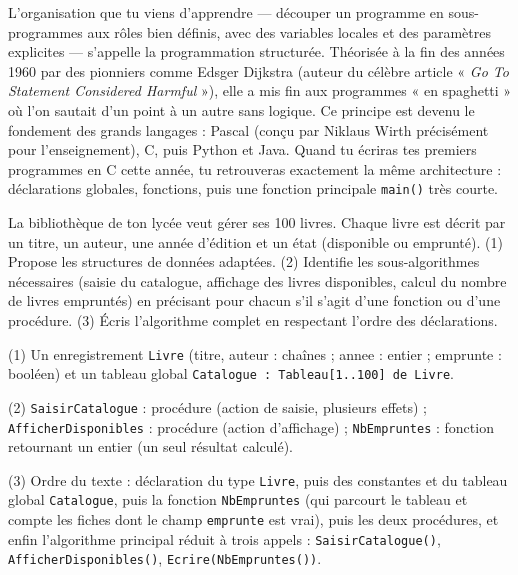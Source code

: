\documentclass[11pt]{article}
\newcommand{\cle}[1]{{\popxbold\color{popdark}#1}}
\begin{document}
\begin{savaistu}
L'organisation que tu viens d'apprendre — découper un programme en sous-programmes aux rôles bien définis, avec des variables locales et des paramètres explicites — s'appelle la \cle{programmation structurée}. Théorisée à la fin des années 1960 par des pionniers comme Edsger Dijkstra (auteur du célèbre article « \emph{Go To Statement Considered Harmful} »), elle a mis fin aux programmes « en spaghetti » où l'on sautait d'un point à un autre sans logique. Ce principe est devenu le fondement des grands langages : Pascal (conçu par Niklaus Wirth précisément pour l'enseignement), C, puis Python et Java. Quand tu écriras tes premiers programmes en C cette année, tu retrouveras exactement la même architecture : déclarations globales, fonctions, puis une fonction principale \texttt{main()} très courte.
\end{savaistu}

\begin{exercice}
La bibliothèque de ton lycée veut gérer ses 100 livres. Chaque livre est décrit par un titre, un auteur, une année d'édition et un état (disponible ou emprunté). (1) Propose les structures de données adaptées. (2) Identifie les sous-algorithmes nécessaires (saisie du catalogue, affichage des livres disponibles, calcul du nombre de livres empruntés) en précisant pour chacun s'il s'agit d'une fonction ou d'une procédure. (3) Écris l'algorithme complet en respectant l'ordre des déclarations.
\end{exercice}

\begin{corrige}
(1) Un enregistrement \texttt{Livre} (titre, auteur : chaînes ; annee : entier ; emprunte : booléen) et un tableau global \texttt{Catalogue : Tableau[1..100] de Livre}.

(2) \texttt{SaisirCatalogue} : procédure (action de saisie, plusieurs effets) ; \texttt{AfficherDisponibles} : procédure (action d'affichage) ; \texttt{NbEmpruntes} : fonction retournant un entier (un seul résultat calculé).

(3) Ordre du texte : déclaration du type \texttt{Livre}, puis des constantes et du tableau global \texttt{Catalogue}, puis la fonction \texttt{NbEmpruntes} (qui parcourt le tableau et compte les fiches dont le champ \texttt{emprunte} est vrai), puis les deux procédures, et enfin l'algorithme principal réduit à trois appels : \texttt{SaisirCatalogue()}, \texttt{AfficherDisponibles()}, \texttt{Ecrire(NbEmpruntes())}.
\end{corrige}
\end{document}
